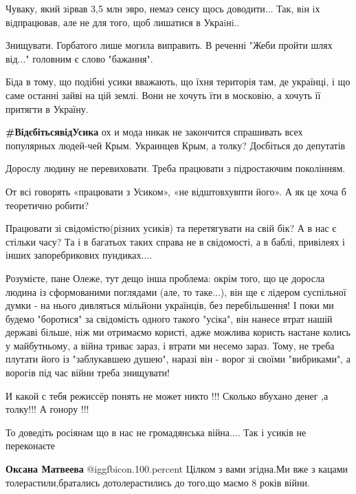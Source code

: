 \begin{itemize}
Чуваку, який зiрвав 3,5 млн эвро, немаэ сенсу щось доводити... Так, вiн iх вiдпрацював, але не для того, щоб лишатися в Украiнi..

Знищувати. Горбатого лише могила виправить. В реченні "Жеби пройти шлях від..." головним є слово "бажання".


Біда в тому, що подібні усики вважають, що їхня територія там, де українці, і
що саме останні зайві на цій землі. Вони не хочуть їти в московію, а хочуть її
притягти в Україну.

\textbf{\#ВідєбітьсявідУсика} ох и мода никак не закончится спрашивать всех популярных людей-чей Крым. Украинцев Крым, а толку? Доєбіться до депутатів

Дорослу людину не перевиховати. Треба працювати з підростаючим поколінням.

От всі говорять «працювати з Усиком», «не відштовхувпти його». А як це хоча б теоретично робити?


Працювати зі свідомістю(різних усиків) та перетягувати на свій бік? А в нас є
стільки часу? Та і в багатьох таких справа не в свідомості, а в баблі,
привілеях і інших запоребрикових пундиках....


Розумієте, пане Олеже, тут дещо інша проблема: окрім того, що це доросла людина
із сформованими поглядами (але, то таке...), він ще є лідером суспільної думки
- на нього дивляться мільйони українців, без перебільшення! І поки ми будемо
"боротися" за свідомість одного такого "усіка", він нанесе втрат нашій державі
більше, ніж ми отримаємо користі, адже можлива користь настане колись у
майбутньому, а війна триває зараз, і втрати ми несемо зараз. Тому, не треба
плутати його із "заблукавшею душею", наразі він - ворог зі своїми "вибриками",
а ворогів під час війни треба знищувати!


И какой с тебя режиссёр понять не может никто !!!
Сколько вбухано денег ,а толку!!! А гонору !!!

То доведіть росіянам що в нас не громадянська війна.... Так і усиків не переконаєте

\begin{itemize} %
\textbf{Оксана Матвеева}  @igg{fbicon.100.percent}  Цілком з вами згідна.Ми вже з кацами толерастили,братались дотолерастились до того,що маємо 8 років війни.
\end{itemize} %


\end{itemize}
